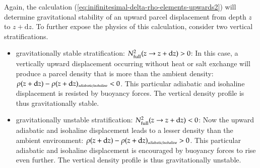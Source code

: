 Again, the calculation
(\ref{eq:inifinitesimal-delta-rho-elements-upwards2}) will determine
gravitational stability of an upward parcel displacement from depth
$z$ to $z+\mathrm{d}z$.  To further expose the physics of this
calculation, consider two vertical stratifications.
\begin{itemize}
\item {\sc gravitationally stable stratification:
    $N^{2}_{\mbox{\scriptsize full}}(z \rightarrow z+\mathrm{d}z) >
    0$}: In this case, a vertically upward displacement occurring
  without heat or salt exchange will produce a parcel density that is
  more than the ambient density: $\rho(z+\mathrm{d} z) -
  \rho(z+\mathrm{d} z)_{\mbox{\tiny adiabatic/isohaline}} <0$. This
  particular adiabatic and isohaline displacement is resisted by
  buoyancy forces.  The vertical density profile is thus
  gravitationally stable.

\item {\sc gravitationally unstable stratification:
    $N^{2}_{\mbox{\scriptsize full}}(z \rightarrow z+\mathrm{d}z) <
    0$}: Now the upward adiabatic and isohaline displacement leads to
  a lesser density than the ambient environment: $\rho(z+\mathrm{d} z)
  - \rho(z+\mathrm{d} z)_{\mbox{\tiny adiabatic/isohaline}} >0$.  This
  particular adiabatic and isohaline displacement is encouraged by
  buoyancy forces to rise even further. The vertical density profile
  is thus gravitationally unstable.

\end{itemize}

